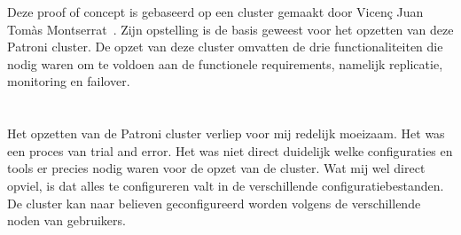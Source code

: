 Deze proof of concept is gebaseerd op een cluster gemaakt door Vicenç Juan Tomàs Montserrat~\textcite{Montserrat2020}. Zijn opstelling is de basis geweest voor het opzetten van deze Patroni cluster. De opzet van deze cluster omvatten de drie functionaliteiten die nodig waren om te voldoen aan de functionele requirements, namelijk replicatie, monitoring en failover.


\section{}
\label{sec:Persoonlijke conclusie}

Het opzetten van de Patroni cluster verliep voor mij redelijk moeizaam. Het was een proces van trial and error. Het was niet direct duidelijk welke configuraties en tools er precies nodig waren voor de opzet van de cluster.
Wat mij wel direct opviel, is dat alles te configureren valt in de verschillende configuratiebestanden. De cluster kan naar believen geconfigureerd worden volgens de verschillende noden van gebruikers.


